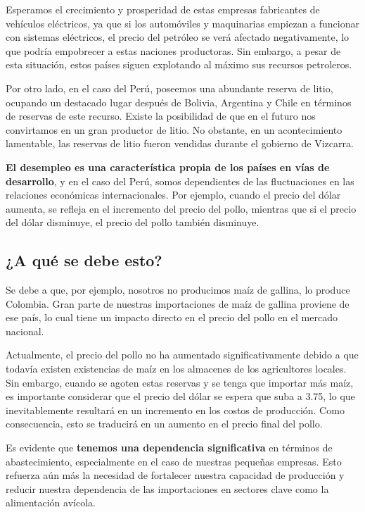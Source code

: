 \documentclass[
  a4paper,
]{article}
\begin{document}
Esperamos el crecimiento y prosperidad de estas empresas fabricantes de
vehículos eléctricos, ya que si los automóviles y maquinarias empiezan a
funcionar con sistemas eléctricos, el precio del petróleo se verá
afectado negativamente, lo que podría empobrecer a estas naciones
productoras. Sin embargo, a pesar de esta situación, estos países siguen
explotando al máximo sus recursos petroleros.

Por otro lado, en el caso del Perú, poseemos una abundante reserva de
litio, ocupando un destacado lugar después de Bolivia, Argentina y Chile
en términos de reservas de este recurso. Existe la posibilidad de que en
el futuro nos convirtamos en un gran productor de litio. No obstante, en
un acontecimiento lamentable, las reservas de litio fueron vendidas
durante el gobierno de Vizcarra.

\textbf{El desempleo es una característica propia de los países en vías
de desarrollo}, y en el caso del Perú, somos dependientes de las
fluctuaciones en las relaciones económicas internacionales. Por ejemplo,
cuando el precio del dólar aumenta, se refleja en el incremento del
precio del pollo, mientras que si el precio del dólar disminuye, el
precio del pollo también disminuye.

\hypertarget{a-quuxe9-se-debe-esto}{%
\subsection{¿A qué se debe esto?}\label{a-quuxe9-se-debe-esto}}

Se debe a que, por ejemplo, nosotros no producimos maíz de gallina, lo
produce Colombia. Gran parte de nuestras importaciones de maíz de
gallina proviene de ese país, lo cual tiene un impacto directo en el
precio del pollo en el mercado nacional.

Actualmente, el precio del pollo no ha aumentado significativamente
debido a que todavía existen existencias de maíz en los almacenes de los
agricultores locales. Sin embargo, cuando se agoten estas reservas y se
tenga que importar más maíz, es importante considerar que el precio del
dólar se espera que suba a 3.75, lo que inevitablemente resultará en un
incremento en los costos de producción. Como consecuencia, esto se
traducirá en un aumento en el precio final del pollo.

Es evidente que \textbf{tenemos una dependencia significativa} en
términos de abastecimiento, especialmente en el caso de nuestras
pequeñas empresas. Esto refuerza aún más la necesidad de fortalecer
nuestra capacidad de producción y reducir nuestra dependencia de las
importaciones en sectores clave como la alimentación avícola.
\end{document}
